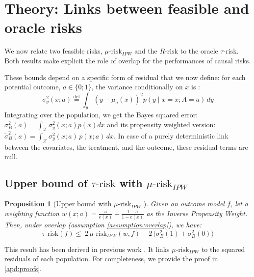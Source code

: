 \documentclass[french,12pt,twoside,a4paper]{book}
\newtheorem{proposition}{Proposition}
\begin{document}
\section{Theory: Links between feasible and oracle risks}\label{sec:theory}

We now relate two feasible risks, $\mu \text{-risk}_{IPW}$ and the
$R\text{-risk}$ to the oracle $\tau\text{-risk}$. Both results make
explicit the role of overlap for the performances of causal risks.

These bounds depend on a specific form of residual that we now define: for each potential outcome, $a \in  \{0; 1\}$, the variance conditionally on $x$
is \citep{shalit_estimating_2017}:
\begin{equation*}\label{eq:residuals}
  \sigma_{y}^{2}(x ; a) \overset{\text{def}}{=}
  \int_{y}\left(y-\mu_{a}(x)\right)^{2} p(y \mid x=x ; A=a) \, d y
\end{equation*}
Integrating over the population, we get the Bayes squared error:
$\sigma^2_{B}(a) = \int_{\mathcal X} \sigma_y^2(x;a) p(x)dx$
and its propensity weighted version:
$\tilde{\sigma}^2_{B}(a) = \int_{\mathcal X}\sigma_y^2(x;a)\,  p(x;
  a)\,dx$. In case of a purely deterministic link between the
covariates, the treatment, and the outcome, these residual terms are null.


\subsection{Upper bound of $\tau\text{-risk}$ with $\mu\text{-risk}_{IPW}$}%
\label{theory:mu_risk_ipw_bound}%

\begin{proposition}[Upper bound with $\mu \text{-risk}_{IPW}$
  ]\label{theory:prop:mu_risk_ipw_bound}
  \citep{johansson2022generalization} Given an outcome model $f$, let a
  weighting function $w(x; a) = \frac{a}{e(x)} + \frac{1-a}{1-e(x)}$ as the
  Inverse Propensity Weight. Then, under overlap (assumption
  \ref{assumption:overlap}), we have:
  \begin{equation*}
    \tau\text{-risk}(f) \leq \; 2 \, \mu\text{-risk}_{IPW}(w, f)
    - 2 \, \big(\sigma^2_{B}(1) +  \sigma^2_{B}(0)\big)
  \end{equation*}
\end{proposition}
This result has been derived in previous work
\citep{johansson2022generalization}. It links $\mu\text{-risk}_{IPW}$ to
the squared residuals of each population. For completeness, we provide the proof in \ref{apd:proofs}.
\end{document}

